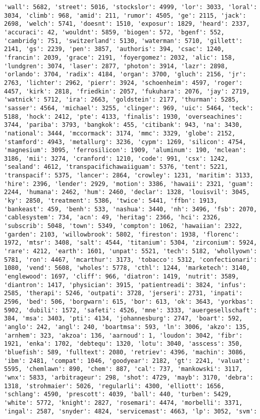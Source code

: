 \documentclass[11pt]{article}
\begin{document}
\begin{Verbatim}[commandchars=\\\{\}]
'wall': 5682, 'street': 5016, 'stockslor': 4999, 'lor': 3033, 'loral': 3034, 'climb': 968, 'amid': 211, 'rumor': 4505, 'ge': 2115, 'jack': 2698, 'welch': 5741, 'doesnt': 1510, 'exposur': 1829, 'heard': 2337, 'accuraci': 42, 'wouldnt': 5859, 'biogen': 572, 'bgenf': 552, 'cambridg': 751, 'switzerland': 5130, 'waterman': 5710, 'gillett': 2141, 'gs': 2239, 'pen': 3857, 'authoris': 394, 'csac': 1240, 'francin': 2039, 'grace': 2191, 'foyergomez': 2032, 'alic': 158, 'lundgren': 3074, 'laser': 2877, 'photon': 3914, 'lazr': 2898, 'orlando': 3704, 'radix': 4184, 'organ': 3700, 'gluch': 2156, 'jr': 2763, 'lichter': 2962, 'pierr': 3924, 'schoenheim': 4597, 'roger': 4457, 'kirk': 2818, 'friedkin': 2057, 'fukuhara': 2076, 'jay': 2719, 'watnick': 5712, 'ira': 2663, 'goldstein': 2177, 'thurman': 5285, 'sasser': 4564, 'michael': 3255, 'clinger': 969, 'uic': 5464, 'teck': 5188, 'hock': 2412, 'pte': 4133, 'finalis': 1930, 'overseachines': 3744, 'pariba': 3793, 'bangkok': 455, 'citibank': 943, 'na': 3430, 'national': 3444, 'mccormack': 3174, 'mmc': 3329, 'globe': 2152, 'stamford': 4943, 'metallurg': 3236, 'cypm': 1269, 'silicon': 4754, 'magnesium': 3095, 'ferrosilicon': 1909, 'aluminum': 190, 'mclean': 3186, 'mii': 3274, 'cranford': 1210, 'code': 991, 'csx': 1242, 'sealand': 4612, 'transpacifichawaiiguam': 5376, 'tent': 5221, 'transpacif': 5375, 'lancer': 2864, 'crowley': 1231, 'maritim': 3133, 'hire': 2396, 'lender': 2929, 'motion': 3386, 'hawaii': 2321, 'guam': 2244, 'humana': 2462, 'hum': 2460, 'declar': 1328, 'louisvil': 3045, 'ky': 2850, 'treatment': 5386, 'twice': 5441, 'ffbn': 1913, 'bankeast': 459, 'benh': 533, 'nashua': 3440, 'nh': 3496, 'fsb': 2070, 'cablesystem': 734, 'acn': 49, 'heritag': 2366, 'hci': 2326, 'subscrib': 5048, 'town': 5349, 'compton': 1062, 'hawaiian': 2322, 'garden': 2103, 'willowbrook': 5802, 'fireston': 1938, 'florenc': 1972, 'mtsr': 3408, 'salt': 4544, 'titanium': 5304, 'zirconium': 5924, 'rare': 4212, 'earth': 1601, 'unpat': 5521, 'tech': 5182, 'whollyown': 5781, 'ron': 4467, 'mcarthur': 3173, 'tobacco': 5312, 'confectionari': 1080, 'vend': 5608, 'wholes': 5778, 'cthl': 1244, 'marketech': 3140, 'englewood': 1697, 'cliff': 966, 'diatron': 1419, 'nutrit': 3589, 'diantron': 1417, 'physician': 3915, 'patientreadi': 3824, 'infus': 2585, 'therapi': 5246, 'outpati': 3728, 'jerseri': 2731, 'inpati': 2596, 'bed': 506, 'borgwarn': 615, 'bor': 613, 'ok': 3643, 'yorkbas': 5902, 'dubili': 1572, 'safeti': 4526, 'mne': 3333, 'auergesellschaft': 384, 'msa': 3403, 'pti': 4134, 'johannesburg': 2747, 'boart': 592, 'anglo': 242, 'angl': 240, 'boartmsa': 593, 'ln': 3006, 'akzo': 135, 'arnhem': 323, 'akzoa': 136, 'aarnoud': 1, 'loudon': 3042, 'fibr': 1921, 'enka': 1702, 'debtequ': 1320, 'lotu': 3040, 'asscess': 350, 'bluefish': 589, 'fulltext': 2080, 'retriev': 4396, 'machin': 3086, 'ibm': 2481, 'compat': 1046, 'goodyear': 2182, 'gt': 2241, 'valuat': 5595, 'chemlawn': 890, 'chem': 887, 'cal': 737, 'mankowski': 3117, 'wnx': 5833, 'arbitrageur': 298, 'shot': 4729, 'mayb': 3170, 'debra': 1318, 'strohmaier': 5026, 'regularli': 4300, 'elliott': 1656, 'schlang': 4590, 'prescott': 4039, 'ball': 440, 'turben': 5429, 'white': 5772, 'knight': 2827, 'rosemari': 4474, 'morbelli': 3371, 'ingal': 2587, 'snyder': 4824, 'servicemast': 4663, 'lp': 3052, 'svm': 
\end{Verbatim}
\end{document}
